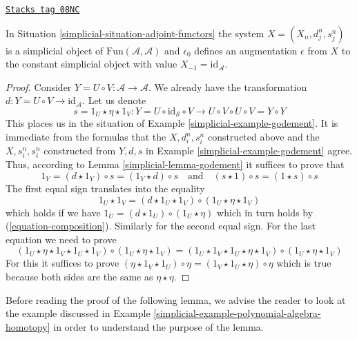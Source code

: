 \begin{lemma}
\label{simplicial-lemma-standard-simplicial}
\href{https://stacks.math.columbia.edu/tag/08NC}{\texttt{Stacks tag 08NC}}

In Situation \ref{simplicial-situation-adjoint-functors}
the system $X = (X_n, d^n_j, s^n_j)$
is a simplicial object of $\text{Fun}(\mathcal{A}, \mathcal{A})$
and $\epsilon_0$ defines an augmentation $\epsilon$ from $X$
to the constant simplicial object with value $X_{-1} = \text{id}_\mathcal{A}$.
\end{lemma}

\begin{proof}

Consider $Y = U \circ V : \mathcal{A} \to \mathcal{A}$.
We already have the transformation
$d : Y = U \circ V \to \text{id}_\mathcal{A}$. Let us denote
$$
s = 1_U \star \eta \star 1_V :
Y = U \circ \text{id}_\mathcal{S} \circ V
\longrightarrow
U \circ V \circ U \circ V = Y \circ Y
$$
This places us in the situation of Example \ref{simplicial-example-godement}.
It is immediate from the formulas that
the $X, d^n_i, s^n_i$ constructed above and the
$X, s^n_i, s^n_i$ constructed from $Y, d, s$
in Example \ref{simplicial-example-godement} agree. Thus, according to
Lemma \ref{simplicial-lemma-godement} it suffices to prove that
$$
1_Y = (d \star 1_Y) \circ s = (1_Y \star d) \circ s
\quad\text{and}\quad
(s \star 1) \circ s = (1 \star s) \circ s
$$
The first equal sign translates into the equality
$$
1_U \star 1_V = (d \star 1_U \star 1_V) \circ (1_U \star \eta \star 1_V)
$$
which holds if we have $1_U = (d \star 1_U) \circ (1_U \star \eta)$
which in turn holds by (\ref{equation-composition}). Similarly for the
second equal sign. For the last equation we need to prove
$$
(1_U \star \eta \star 1_V \star 1_U \star 1_V) \circ
(1_U \star \eta \star 1_V) =
(1_U \star 1_V \star 1_U \star \eta \star 1_V) \circ
(1_U \star \eta \star 1_V)
$$
For this it suffices to prove
$(\eta \star 1_V \star 1_U) \circ \eta = (1_V \star 1_U \star \eta) \circ \eta$
which is true because both sides are the same as $\eta \star \eta$.
\end{proof}

Before reading the proof of the following lemma, we advise the
reader to look at the example discussed in
Example \ref{simplicial-example-polynomial-algebra-homotopy}
in order to understand the purpose of the lemma.

